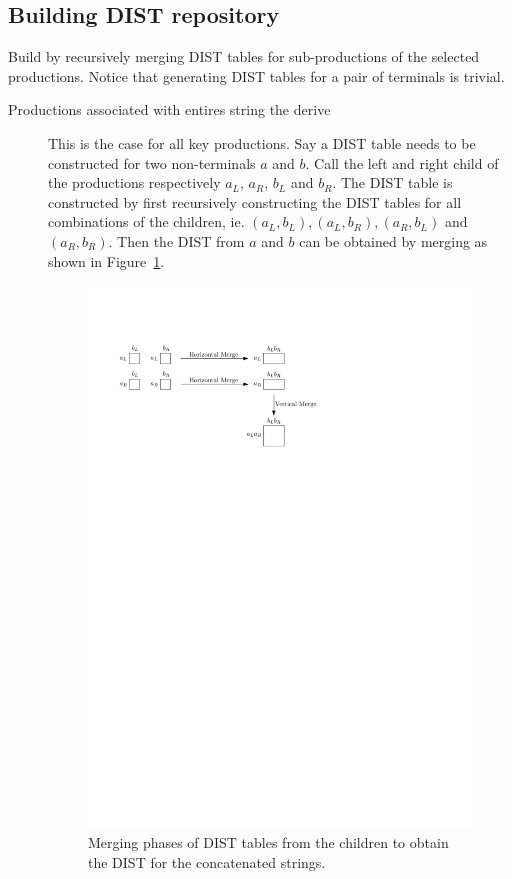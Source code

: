 \documentclass[twoside,11pt,openright]{report}
\begin{document}
\subsection{Building DIST repository}
\label{sec:algorithm:building-DISTs-overview}
Build by recursively merging DIST tables for sub-productions of the selected productions. Notice that generating DIST tables for a pair of terminals is trivial.
\begin{description}
  \item[Productions associated with entires string the derive] This is the case for all key productions. Say a DIST table needs to be constructed for two non-terminals $a$ and $b$. Call the left and right child of the productions respectively $a_L$, $a_R$, $b_L$ and $b_R$. The DIST table is constructed by first recursively constructing the DIST tables for all combinations of the children, ie. $(a_L, b_L), (a_L, b_R), (a_R, b_L)$ and $(a_R, b_R)$. Then the DIST from $a$ and $b$ can be obtained by merging as shown in Figure~\ref{fig:compression:dist:merge}.
  \begin{figure}
    \centering
    \includegraphics{images/dist_merge}
    \caption{Merging phases of DIST tables from the children to obtain the DIST for the concatenated strings.}
    \label{fig:compression:dist:merge}
  \end{figure}


\end{description}
\end{document}
